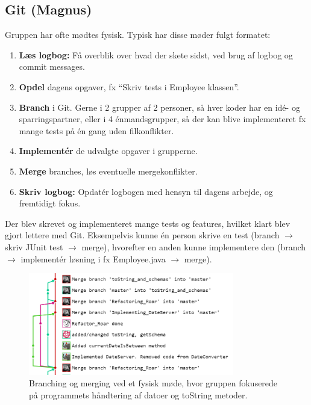 \subsection{Git (Magnus)}

Gruppen har ofte mødtes fysisk. Typisk har disse møder fulgt formatet:

\begin{enumerate}
\item \textbf{Læs logbog:} Få overblik over hvad der skete sidst, ved brug af logbog og commit messages.
\item \textbf{Opdel} dagens opgaver, fx “Skriv tests i Employee klassen”.
\item \textbf{Branch} i Git. Gerne i 2 grupper af 2 personer, så hver koder har en idé- og sparringspartner, eller i 4 énmandsgrupper, så der kan blive implementeret fx mange tests på én gang uden filkonflikter.
\item \textbf{Implementér} de udvalgte opgaver i grupperne.
\item \textbf{Merge} branches, løs eventuelle mergekonflikter.
\item \textbf{Skriv logbog:} Opdatér logbogen med hensyn til dagens arbejde, og fremtidigt fokus.
\end{enumerate}


Der blev skrevet og implementeret mange tests og features, hvilket klart blev gjort lettere med Git. Eksempelvis kunne én person skrive en test (branch $\rightarrow$ skriv JUnit test $\rightarrow$ merge), hvorefter en anden kunne implementere den (branch $\rightarrow$ implementér løsning i fx Employee.java $\rightarrow$ merge). 
 

\begin{figure}[H]
    \centering
    \includegraphics[width = 0.8\textwidth]{Figurer/git_branches.PNG}
    \caption{Branching og merging ved et fysisk møde, hvor gruppen fokuserede på programmets håndtering af datoer og toString metoder.}
    \label{fig:gitex}
\end{figure}

